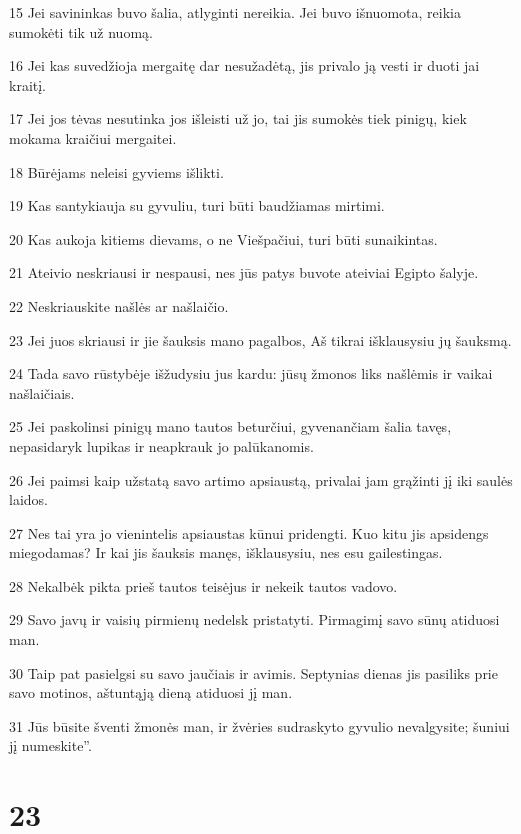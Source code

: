 \par 15 Jei savininkas buvo šalia, atlyginti nereikia. Jei buvo išnuomota, reikia sumokėti tik už nuomą. 
\par 16 Jei kas suvedžioja mergaitę dar nesužadėtą, jis privalo ją vesti ir duoti jai kraitį. 
\par 17 Jei jos tėvas nesutinka jos išleisti už jo, tai jis sumokės tiek pinigų, kiek mokama kraičiui mergaitei. 
\par 18 Būrėjams neleisi gyviems išlikti. 
\par 19 Kas santykiauja su gyvuliu, turi būti baudžiamas mirtimi. 
\par 20 Kas aukoja kitiems dievams, o ne Viešpačiui, turi būti sunaikintas. 
\par 21 Ateivio neskriausi ir nespausi, nes jūs patys buvote ateiviai Egipto šalyje. 
\par 22 Neskriauskite našlės ar našlaičio. 
\par 23 Jei juos skriausi ir jie šauksis mano pagalbos, Aš tikrai išklausysiu jų šauksmą. 
\par 24 Tada savo rūstybėje išžudysiu jus kardu: jūsų žmonos liks našlėmis ir vaikai našlaičiais. 
\par 25 Jei paskolinsi pinigų mano tautos beturčiui, gyvenančiam šalia tavęs, nepasidaryk lupikas ir neapkrauk jo palūkanomis. 
\par 26 Jei paimsi kaip užstatą savo artimo apsiaustą, privalai jam grąžinti jį iki saulės laidos. 
\par 27 Nes tai yra jo vienintelis apsiaustas kūnui pridengti. Kuo kitu jis apsidengs miegodamas? Ir kai jis šauksis manęs, išklausysiu, nes esu gailestingas. 
\par 28 Nekalbėk pikta prieš tautos teisėjus ir nekeik tautos vadovo. 
\par 29 Savo javų ir vaisių pirmienų nedelsk pristatyti. Pirmagimį savo sūnų atiduosi man. 
\par 30 Taip pat pasielgsi su savo jaučiais ir avimis. Septynias dienas jis pasiliks prie savo motinos, aštuntąją dieną atiduosi jį man. 
\par 31 Jūs būsite šventi žmonės man, ir žvėries sudraskyto gyvulio nevalgysite; šuniui jį numeskite”.



\chapter{23}

